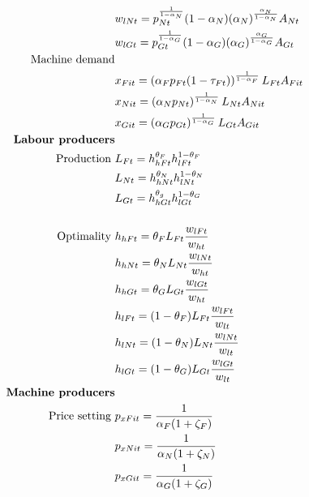 \begin{align}
& w_{lNt}=p_{Nt}^\frac{1}{1-\alpha_N}(1-\alpha_N)(\alpha_N)^\frac{\alpha_N}{1-\alpha_N}A_{Nt}\nonumber\\
& w_{lGt}=p_{Gt}^\frac{1}{1-\alpha_G}(1-\alpha_G)(\alpha_G)^\frac{\alpha_G}{1-\alpha_G}A_{Gt}\nonumber
\\
\text{Machine demand}&\nonumber
\\
&x_{Fit}= \left(\alpha_F p_{Ft}(1-\tau_{Ft})\right)^\frac{1}{1-\alpha_F}L_{Ft}A_{Fit}\nonumber\\
&x_{Nit}= \left(\alpha_N p_{Nt}\right)^\frac{1}{1-\alpha_N}L_{Nt}A_{Nit}\nonumber\\
&x_{Git}= \left(\alpha_G p_{Gt}\right)^\frac{1}{1-\alpha_G}L_{Gt}A_{Git}\nonumber
\\
\text{\textbf{Labour producers}}&\nonumber
\\
\text{Production}\ \vspace{4mm}& L_{Ft}=h_{hFt}^{\theta_{F}}h_{lFt}^{1-\theta_{F}}\label{mod:LF}\\
& L_{Nt}=h_{hNt}^{\theta_{N}}h_{lNt}^{1-\theta_{N}}\label{mod:LN}\\
& L_{Gt}=h_{hGt}^{\theta_{g}}h_{lGt}^{1-\theta_{G}}\label{mod:LG}\\
\ \\
\text{Optimality}\ \vspace{4mm}& h_{hFt}= \theta_{F}L_{Ft}\frac{w_{lFt}}{w_{ht}}\nonumber\\ %
& h_{hNt}= \theta_{N}L_{Nt}\frac{w_{lNt}}{w_{ht}}\nonumber\\
& h_{hGt}= \theta_{G}L_{Gt}\frac{w_{lGt}}{w_{ht}}\nonumber\\
& h_{lFt}= (1-\theta_{F})L_{Ft}\frac{w_{lFt}}{w_{lt}}\nonumber\\%
& h_{lNt}= (1-\theta_{N}) L_{Nt}\frac{w_{lNt}}{w_{lt}}\nonumber\\
& h_{lGt}= (1-\theta_{G}) L_{Gt}\frac{w_{lGt}}{w_{lt}}\nonumber\\
%
\text{\textbf{Machine producers}}\nonumber\\
\text{Price setting}\ \vspace{4mm}&p_{xFit}=\frac{1}{\alpha_F(1+\zeta_F)}\nonumber\\
&p_{xNit}=\frac{1}{\alpha_N(1+\zeta_N)}\nonumber\\
&p_{xGit}=\frac{1}{\alpha_G(1+\zeta_G)}
\nonumber\\ 

\end{align}
